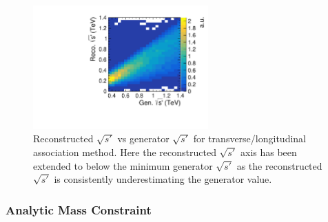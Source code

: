 \begin{figure}
  \centering
  \includegraphics[width=0.6\textwidth]{TopAnalysis/figures/CrudeEVsTrueE.pdf}
  \caption[Reconstructed $\sqrt{s'}$ vs generator $\sqrt{s'}$ for transverse/longitudinal association method]{Reconstructed $\sqrt{s'}$ vs generator $\sqrt{s'}$ for transverse/longitudinal association method. Here the reconstructed $\sqrt{s'}$ axis has been extended to below the minimum generator $\sqrt{s'}$ as the reconstructed $\sqrt{s'}$ is consistently underestimating the generator value. }
  \label{fig:simpleAssoication}
\end{figure}

\subsubsection{Analytic Mass Constraint}

